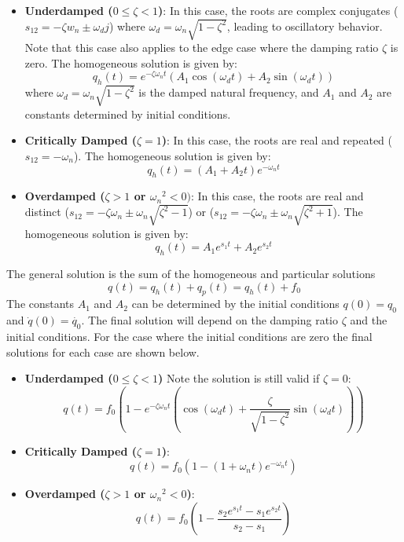 \begin{itemize}
    \item {\bf Underdamped ($0 \leq \zeta<1$)}: In this case, the roots are complex conjugates ($s_{12}=-\zeta w_n \pm \omega_d j$) where $\omega_d = \omega_n\sqrt{1 - \zeta^2}$, leading to oscillatory behavior. Note that this case also applies to the edge case where the damping ratio $\zeta$ is zero. The homogeneous solution is given by:
    \begin{equation}
        q_h(t) = e^{-\zeta \omega_n t} \left( A_1 \cos(\omega_d t) + A_2 \sin(\omega_d t) \right)
    \end{equation}
    where $\omega_d = \omega_n \sqrt{1 - \zeta^2}$ is the damped natural frequency, and $A_1$ and $A_2$ are constants determined by initial conditions.

    \item {\bf Critically Damped ($\zeta=1$)}: In this case, the roots are real and repeated ($s_{12}=-\omega_n$). The homogeneous solution is given by:
    \begin{equation}
        q_h(t) = (A_1 + A_2 t) e^{-\omega_n t}
    \end{equation}

    \item {\bf Overdamped ($\zeta>1$ or ${\omega_n}^2<0)$}: In this case, the roots are real and distinct ($s_{12}=-\zeta \omega_n \pm \omega_n \sqrt{\zeta^2-1}$) or ($s_{12}=-\zeta \omega_n \pm \omega_n \sqrt{\zeta^2+1}$). The homogeneous solution is given by:
    \begin{equation}
        q_h(t) = A_1 e^{s_1 t} + A_2 e^{s_2 t}
    \end{equation}
\end{itemize}
The general solution is the sum of the homogeneous and particular solutions
\begin{equation}
    q(t) = q_h(t) + q_p(t) = q_h(t) + f_0
\end{equation}
The constants $A_1$ and $A_2$ can be determined by the initial conditions $q(0)=q_0$ and $\dot{q}(0)=\dot{q_0}$. The final solution will depend on the damping ratio $\zeta$ and the initial conditions. For the case where the initial conditions are zero the final solutions for each case are shown below.
\begin{itemize}
    \item {\bf Underdamped ($0 \leq \zeta<1$)} Note the solution is still valid if $\zeta=0$:
    \begin{equation}
        q(t) = f_0 \left( 1 - e^{-\zeta \omega_n t} \left( \cos(\omega_d t) + \frac{\zeta}{\sqrt{1-\zeta^2}} \sin(\omega_d t) \right) \right)
    \end{equation}
    \item {\bf Critically Damped ($\zeta=1$)}:
    \begin{equation}
        q(t) = f_0 \left( 1 - (1 + \omega_n t) e^{-\omega_n t} \right)
    \end{equation}
    \item {\bf Overdamped ($\zeta>1$ or ${\omega_n}^2<0$)}:
    \begin{equation}
        q(t) = f_0 \left( 1 - \frac{s_2 e^{s_1 t} - s_1 e^{s_2 t}}{s_2 - s_1} \right)
    \end{equation}
\end{itemize}
